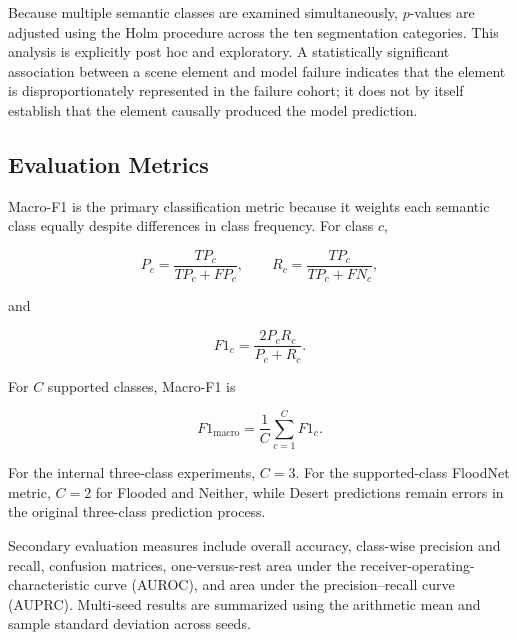 Because multiple semantic classes are examined simultaneously,
\(p\)-values are adjusted using the Holm procedure across the ten
segmentation categories. This analysis is explicitly post hoc and
exploratory. A statistically significant association between a scene
element and model failure indicates that the element is
disproportionately represented in the failure cohort; it does not by
itself establish that the element causally produced the model prediction.

\subsection{Evaluation Metrics}

Macro-F1 is the primary classification metric because it weights each
semantic class equally despite differences in class frequency. For class
\(c\),

\[
P_c =
\frac{TP_c}{TP_c + FP_c},
\qquad
R_c =
\frac{TP_c}{TP_c + FN_c},
\]

and

\[
F1_c =
\frac{2P_cR_c}{P_c + R_c}.
\]

For \(C\) supported classes, Macro-F1 is

\[
F1_{\mathrm{macro}}
=
\frac{1}{C}
\sum_{c=1}^{C} F1_c.
\]

For the internal three-class experiments, \(C=3\). For the
supported-class FloodNet metric, \(C=2\) for Flooded and Neither, while
Desert predictions remain errors in the original three-class prediction
process.

Secondary evaluation measures include overall accuracy, class-wise
precision and recall, confusion matrices, one-versus-rest area under the
receiver-operating-characteristic curve (AUROC), and area under the
precision--recall curve (AUPRC). Multi-seed results are summarized using
the arithmetic mean and sample standard deviation across seeds.
